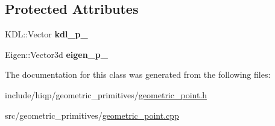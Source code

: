\subsection*{Protected Attributes}
\begin{DoxyCompactItemize}
\item 
\hypertarget{classhiqp_1_1GeometricPoint_a55aba9f42a41e72cd09bdf56625c62f3}{K\-D\-L\-::\-Vector {\bfseries kdl\-\_\-p\-\_\-}}\label{classhiqp_1_1GeometricPoint_a55aba9f42a41e72cd09bdf56625c62f3}

\item 
\hypertarget{classhiqp_1_1GeometricPoint_aef74d9b7a7e6700650206950273f7e6c}{Eigen\-::\-Vector3d {\bfseries eigen\-\_\-p\-\_\-}}\label{classhiqp_1_1GeometricPoint_aef74d9b7a7e6700650206950273f7e6c}

\end{DoxyCompactItemize}


The documentation for this class was generated from the following files\-:\begin{DoxyCompactItemize}
\item 
include/hiqp/geometric\-\_\-primitives/\hyperlink{geometric__point_8h}{geometric\-\_\-point.\-h}\item 
src/geometric\-\_\-primitives/\hyperlink{geometric__point_8cpp}{geometric\-\_\-point.\-cpp}\end{DoxyCompactItemize}
